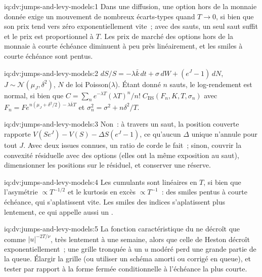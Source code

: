 \begin{solution}{iq:dv:jumps-and-levy-models:1}
Dans une diffusion, une option hors de la monnaie donnée exige un mouvement de nombreux écarts-types quand $T\to0$, si bien que son prix
tend vers zéro exponentiellement vite~; avec des sauts, un seul saut suffit et le prix est proportionnel à $T$. Les prix de marché des
options hors de la monnaie à courte échéance diminuent à peu près linéairement, et les smiles à courte échéance sont pentus.
\end{solution}

\begin{solution}{iq:dv:jumps-and-levy-models:2}
$dS/S=-\lambda\bar k\,dt+\sigma\,dW+(e^J-1)\,dN$, $J\sim\mathcal N(\mu_J,\delta^2)$, $N$ de loi Poisson($\lambda$). Étant donné $n$
sauts, le log-rendement est normal, si bien que $C=\sum_n e^{-\lambda T}(\lambda T)^n/n!\;C_{\mathrm{BS}}(F_n,K,T,\sigma_n)$ avec
$F_n=Fe^{n(\mu_J+\delta^2/2)-\lambda\bar kT}$ et $\sigma_n^2=\sigma^2+n\delta^2/T$.
\end{solution}

\begin{solution}{iq:dv:jumps-and-levy-models:3}
Non~: à travers un saut, la position couverte rapporte $V(Se^J)-V(S)-\Delta S(e^J-1)$, ce qu'aucun $\Delta$ unique n'annule pour
tout $J$. Avec deux issues connues, un ratio de corde le fait~; sinon, couvrir la convexité résiduelle avec des options (elles ont
la même exposition au saut), dimensionner les positions sur le résiduel, et conserver une réserve.
\end{solution}

\begin{solution}{iq:dv:jumps-and-levy-models:4}
Les cumulants sont linéaires en $T$, si bien que l'asymétrie $\propto T^{-1/2}$ et le kurtosis en excès $\propto T^{-1}$~: des smiles pentus à
courte échéance, qui s'aplatissent vite. Les smiles des indices s'aplatissent plus lentement, ce qui appelle aussi un .
\end{solution}

\begin{solution}{iq:dv:jumps-and-levy-models:5}
La fonction caractéristique du  ne décroît que comme $|u|^{-2T/\nu}$, très lentement à une semaine, alors que celle de Heston
décroît exponentiellement~; une grille tronquée à un $u$ modéré perd une grande partie de la queue. Élargir la grille (ou utiliser un schéma amorti ou
corrigé en queue), et tester par rapport à la forme fermée conditionnelle à l'échéance la plus courte.
\end{solution}

